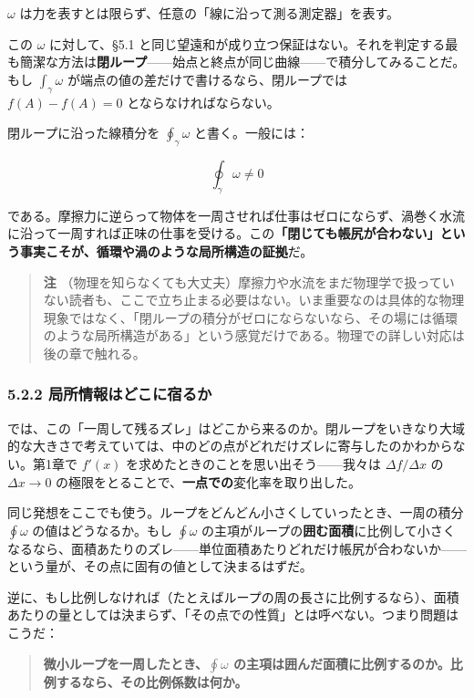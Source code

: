 \documentclass[a4paper,12pt,openany]{book}
\begin{document}
\(\omega\) は力を表すとは限らず、任意の「線に沿って測る測定器」を表す。

この \(\omega\) に対して、§5.1
と同じ望遠和が成り立つ保証はない。それを判定する最も簡潔な方法は\textbf{閉ループ}——始点と終点が同じ曲線——で積分してみることだ。もし
\(\int_\gamma \omega\) が端点の値の差だけで書けるなら、閉ループでは
\(f(A)-f(A)=0\) とならなければならない。

閉ループに沿った線積分を \(\oint_\gamma \omega\) と書く。一般には：

\[\oint_\gamma \omega \neq 0\]

である。摩擦力に逆らって物体を一周させれば仕事はゼロにならず、渦巻く水流に沿って一周すれば正味の仕事を受ける。この\textbf{「閉じても帳尻が合わない」という事実こそが、循環や渦のような局所構造の証拠}だ。

\begin{quote}
\textbf{注}
（物理を知らなくても大丈夫）摩擦力や水流をまだ物理学で扱っていない読者も、ここで立ち止まる必要はない。いま重要なのは具体的な物理現象ではなく、「閉ループの積分がゼロにならないなら、その場には循環のような局所構造がある」という感覚だけである。物理での詳しい対応は後の章で触れる。
\end{quote}

\hypertarget{ux5c40ux6240ux60c5ux5831ux306fux3069ux3053ux306bux5bbfux308bux304b}{%
\subsubsection{5.2.2
局所情報はどこに宿るか}\label{ux5c40ux6240ux60c5ux5831ux306fux3069ux3053ux306bux5bbfux308bux304b}}

では、この「一周して残るズレ」はどこから来るのか。閉ループをいきなり大域的な大きさで考えていては、中のどの点がどれだけズレに寄与したのかわからない。第1章で
\(f'(x)\) を求めたときのことを思い出そう——我々は
\(\Delta f / \Delta x\) の \(\Delta x \to 0\)
の極限をとることで、\textbf{一点での}変化率を取り出した。

同じ発想をここでも使う。ループをどんどん小さくしていったとき、一周の積分
\(\oint \omega\) の値はどうなるか。もし \(\oint \omega\)
の主項がループの\textbf{囲む面積}に比例して小さくなるなら、面積あたりのズレ——単位面積あたりどれだけ帳尻が合わないか——という量が、その点に固有の値として決まるはずだ。

逆に、もし比例しなければ（たとえばループの周の長さに比例するなら）、面積あたりの量としては決まらず、「その点での性質」とは呼べない。つまり問題はこうだ：

\begin{quote}
\textbf{微小ループを一周したとき、$\oint \omega$ の主項は囲んだ面積に比例するのか。比例するなら、その比例係数は何か。}
\end{quote}
\end{document}
